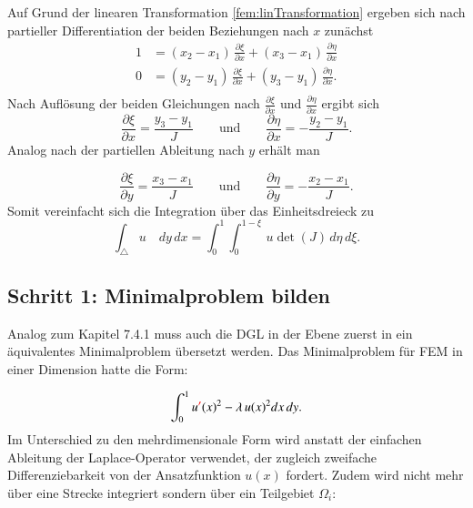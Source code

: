 Auf Grund der linearen Transformation \eqref{fem:linTransformation}
ergeben sich nach partieller Differentiation der beiden Beziehungen
nach $x$ zunächst
\begin{equation}
\begin{aligned}
1  &= (x_2 -x_1) \, \frac{\partial \xi}{\partial x} + (x_3 -x_1) \, \frac{\partial \eta}{\partial x} \\
0 &= (y_2 -y_1) \, \frac{\partial \xi}{\partial x} + (y_3 -y_1) \, \frac{\partial \eta}{\partial x}.\\
 \end{aligned}
\end{equation}
Nach Auflösung  der beiden Gleichungen nach
$\displaystyle\frac{\partial \xi}{\partial x}$ und
$\displaystyle\frac{\partial \eta}{\partial x}$
ergibt sich
\begin{equation}
\frac{\partial \xi}{\partial x} = \frac{y_3 - y_1}{J}
\qquad \text{und}\qquad
\frac{\partial \eta}{\partial x} = -\frac{y_2 - y_1}{J}.
\end{equation}
Analog nach der partiellen Ableitung nach $y$ erhält man

\begin{equation}
\frac{\partial \xi}{\partial y} = \frac{x_3 - x_1}{J}
\qquad \text{und}\qquad
\frac{\partial \eta}{\partial y} = -\frac{x_2 - x_1}{J}.
\end{equation}
Somit vereinfacht sich die Integration über das Einheitsdreieck zu
\begin{equation}
			\int_{\triangle} u \quad dy \, dx = \int_0^1 \int_0^{1 - \xi} \, u \det (J) \, d \eta \, d \xi.
\end{equation}

\subsection{Schritt 1: Minimalproblem bilden}

Analog zum Kapitel 7.4.1 muss auch die DGL in der Ebene zuerst in
ein äquivalentes Minimalproblem übersetzt werden.
Das Minimalproblem für FEM in einer Dimension hatte die Form:

\begin{equation}
			\int_0^1 u {\color{red}{'}}(x)^2 - \lambda \, u(x)^2 dx \,dy.
			\label{fem:Minimal1D}
\end{equation}
Im Unterschied zu den mehrdimensionale Form wird anstatt der einfachen
Ableitung der Laplace-Operator verwendet, der zugleich zweifache
Differenziebarkeit von der Ansatzfunktion $u(x)$ fordert.
Zudem wird nicht mehr über eine Strecke integriert sondern über ein
Teilgebiet $\Omega_i$:

